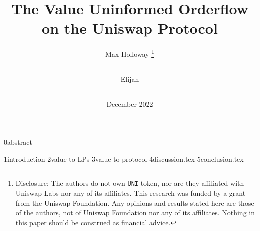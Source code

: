 \documentclass{article}
\title{The Value Uninformed Orderflow on the Uniswap Protocol}
\author{
    Max Holloway \footnote{Disclosure: The authors do not own \texttt{UNI} token, nor are they affiliated with Uniswap Labs nor any of its affiliates. This research was funded by a grant from the Uniswap Foundation. Any opinions and results stated here are those of the authors, not of Uniswap Foundation nor any of its affiliates. Nothing in this paper should be construed as financial advice.} \\ 
    \texttt{
        \href{mailto:max@xenophonlabs.com}{\color{black}{max@xenophonlabs.com}}
    } \and
    Elijah \\
    \texttt{
        \href{mailto:elijah@duality.xyz}{\color{black}{elijah@duality.xyz}}
    }
}
\date{December 2022}
\begin{document}
    \maketitle    
    {0abstract}
    
    {1introduction}
    {2value-to-LPs}
    {3value-to-protocol}
    {4discussion.tex}
    {5conclusion.tex}
    
    \appendix
    \newpage

    \newpage
    \printbibliography
    
\end{document}
